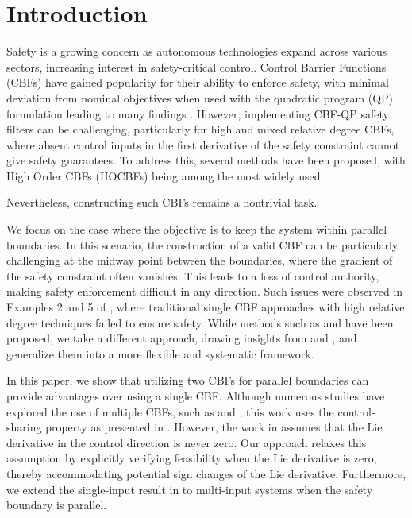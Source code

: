 \documentclass[letterpaper, 10 pt, conference]{ieeeconf}
\newcommand{\TODO}[1]{{\color{black}#1}}
\begin{document}
\section{Introduction}
Safety is a growing concern as autonomous technologies expand across various sectors, increasing interest in safety-critical control. Control Barrier Functions (CBFs) \cite{ames2019cbf_theory,wieland_constructive_2007} have gained popularity for their ability to enforce safety, with minimal deviation from nominal objectives when used with the quadratic program (QP) formulation \cite{ames2014cbfqp_cruise,ames2017cbfqp_critical} leading to many findings \cite{abel2023prescribed_time,velimir_safe,koga_safe_2023}. However, implementing CBF-QP safety filters can be challenging, particularly for high and mixed relative degree CBFs, where absent control inputs in the first derivative of the safety constraint cannot give safety guarantees. To address this, several methods have been proposed, with High Order CBFs (HOCBFs) \cite{xiao_hocbf} being among the most widely used. \TODO{Nevertheless, constructing such CBFs remains a nontrivial task.

We focus on the case where the objective is to keep the system within parallel boundaries. In this scenario, the construction of a valid CBF can be particularly challenging at the midway point between the boundaries, where the gradient of the safety constraint often vanishes. This leads to a loss of control authority, making safety enforcement difficult in any direction. Such issues were observed in Examples 2 and 5 of \cite{cohen_backstep_rom_2024}, where traditional single CBF approaches with high relative degree techniques failed to ensure safety. While methods such as \cite{taylor_safe_2022} and \cite{ong_rectified_2024} have been proposed, we take a different approach, drawing insights from \cite{drew_brugg_sim_LK} and \cite{koga_safe_2023}, and generalize them into a more flexible and systematic framework.

In this paper, we show that utilizing two CBFs for parallel boundaries can provide advantages over using a single CBF. Although numerous studies have explored the use of multiple CBFs, such as \cite{molnar2023composing} and \cite{alyaseen2024safetycriticalcontroldiscontinuoussystems}, this work uses the control-sharing property as presented in \cite{XU2018195}. However, the work in \cite{XU2018195} assumes that the Lie derivative in the control direction is never zero. Our approach relaxes this assumption by explicitly verifying feasibility when the Lie derivative is zero, thereby accommodating potential sign changes of the Lie derivative. Furthermore, we extend the single-input result in \cite{XU2018195} to multi-input systems when the safety boundary is parallel. 

}
\end{document}
